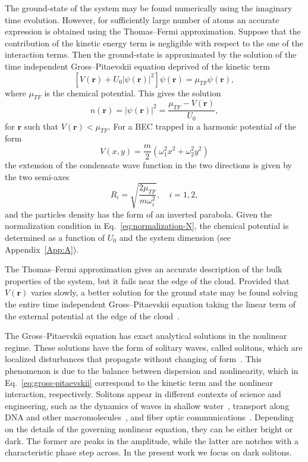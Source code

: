 The ground-state of the system may be found numerically using the imaginary time evolution. However, for sufficiently large number of atoms an accurate expression is obtained using the Thomas--Fermi approximation. Suppose that the contribution of the kinetic energy term is negligible with respect to the one of the interaction terms. Then the ground-state is approximated by the solution of the time independent Gross--Pitaevskii equation deprived of the kinetic term
\begin{equation}
\left[ V(\textbf{r}) + U_0 |\psi(\textbf{r})|^2 \right] \psi(\textbf{r}) = \mu_{TF} \psi(\textbf{r}),
\end{equation}
where $\mu_{TF}$ is the chemical potential. This gives the solution
\begin{equation}
n(\textbf{r}) = |\psi(\textbf{r})|^2 = \frac{\mu_{TF} - V(\textbf{r})}{U_0},
\end{equation}
for $\textbf{r}$ such that $V(\textbf{r}) < \mu_{TF}$. 
For a BEC trapped in a harmonic potential of the form
\begin{equation}
V(x,y) = \frac{m}{2} (\omega_1^2 x^2 + \omega_2^2 y^2)
\end{equation}
the extension of the condensate wave function in the two directions is given by the two semi-axes
\begin{equation} \label{eq:TF-radius}
R_i = \sqrt{\frac{2\mu_{TF}}{m\omega_i^2}}, \quad i = 1,2 ,
\end{equation}
and the particles density has the form of an inverted parabola. Given the normalization condition in Eq.~\eqref{eq:normalization-N}, the chemical potential is determined as a function of $U_0$ and the system dimension (see Appendix~\ref{App:A}).

The Thomas--Fermi approximation gives an accurate description of the bulk properties of the system, but it fails near the edge of the cloud. Provided that $V(\textbf{r})$ varies slowly, a better solution for the ground state may be found solving the entire time independent Gross--Pitaevskii equation taking the linear term of the external potential at the edge of the cloud~\citep{pethick2002bose}.

The Gross--Pitaevskii equation has exact analytical solutions in the nonlinear regime. These solutions have the form of solitary waves, called solitons, which are localized disturbances that propagate without changing of form~\citep{RC97,JKP98,DCLZ98,ZPMW99}. This phenomenon is due to the balance between dispersion and nonlinearity, which in Eq.~\eqref{eq:gross-pitaevskii} correspond to the kinetic term and the nonlinear interaction, respectively. Solitons appear in different contexts of science and engineering, such as the dynamics of waves in shallow water~\citep{B88}, transport along DNA and other macromolecules~\citep{P95}, and fiber optic communications~\citep{H90}.
Depending on the details of the governing nonlinear equation, they can be either bright or dark. The former are peaks in the amplitude, while the latter are notches with a characteristic phase step across. In the present work we focus on dark solitons. 

